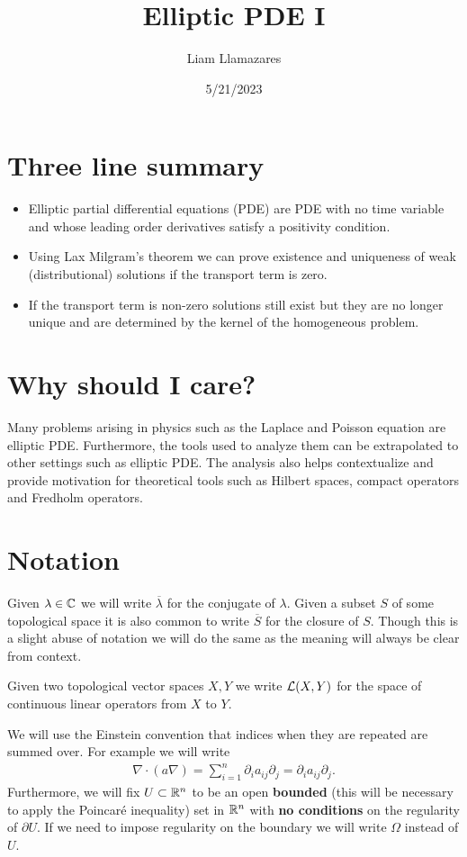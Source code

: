 \documentclass[12pt]{article}
\theoremstyle{definition}
\begin{document}
\title{Elliptic PDE I}
\author{Liam Llamazares}
\date{5/21/2023}
\maketitle
\section{ Three line summary}
\begin{itemize}
  \item Elliptic partial differential equations (PDE) are PDE with no time variable and whose leading order derivatives satisfy a positivity condition.
  \item Using Lax Milgram's theorem we can prove existence and uniqueness of weak (distributional) solutions if the transport term is zero.
  \item If the transport term is non-zero solutions still exist but they are no longer unique and are determined by the kernel of the homogeneous problem.\end{itemize}
\section{Why should I care?}
Many problems arising in physics such as the Laplace and Poisson equation are elliptic PDE. Furthermore, the tools used to analyze them can be extrapolated to other settings such as
elliptic PDE. The analysis also helps contextualize and provide motivation for theoretical tools such as Hilbert spaces, compact operators and Fredholm operators.
\section{Notation}
Given $\lambda \in \mathbb{C}$ we will write $\overline{\lambda }$ for the conjugate of $\lambda $. Given a subset $S$ of some topological space it is also common to write  $\overline{S}$ for the closure of $S$. Though this is a slight abuse of notation we will do the same as the meaning will always be clear from context.

Given two topological vector spaces $X,Y$ we write  $\mathcal{L}(X,Y)$ for the space of continuous linear operators from $X$ to  $Y$.

We will use the Einstein convention that indices when they are repeated are summed over. For example we will write
\begin{align*}
  \nabla \cdot (a \nabla)=\sum_{i=1}^n \partial_i a_{ij} \partial _j =\partial_i a_{ij} \partial _j.
\end{align*}
Furthermore, we will fix $U \subset \mathbb{R}^n$ to be an open \textbf{bounded} (this will be necessary to apply the Poincaré inequality) set in $\mathbb{R}^n$ with \textbf{no conditions} on the regularity of $\partial U$. If we need to impose regularity on the boundary we will write $\Omega$ instead of $U$.
\end{document}
